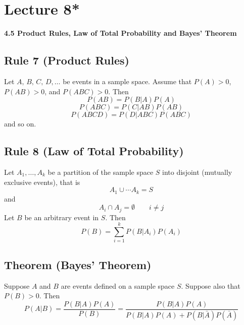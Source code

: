 \section{Lecture 8*}
\textbf{4.5 Product Rules, Law of Total Probability and Bayes' Theorem}

\begin{thmbox}
    \subsection{Rule 7 (Product Rules)}
    Let $ A,\,B,\,C,\,D,\ldots  $ be events in a sample space. Assume
    that $ P(A)>0 $, $ P(AB)>0 $, and $ P(ABC)>0 $. Then
    \[ P(AB)=P(B|A)P(A) \]
    \[ P(ABC)=P(C|AB)P(AB) \]
    \[ P(ABCD)=P(D|ABC)P(ABC) \]
    and so on.
\end{thmbox}

\begin{thmbox}
    \subsection{Rule 8 (Law of Total Probability)}
    Let $ A_1,\ldots ,A_k $ be a partition of the sample space $ S $
    into disjoint (mutually exclusive events), that is
    \[ A_1\cup\cdots A_k=S \]
    and
    \[ A_i\cap A_j=\emptyset\qquad i\neq j \]
    Let $ B $ be an arbitrary event in $ S $. Then
    \[ P(B)=\sum\limits_{i=1}^{k} P(B|A_i)P(A_i) \]
\end{thmbox}

\begin{thmbox}
    \subsection{Theorem (Bayes' Theorem)}
    Suppose $ A $ and $ B $ are events defined on a sample space $ S $. Suppose
    also that $ P(B)>0 $. Then
    \[ P(A|B)=\frac{P(B|A)P(A)}{P(B)}=\frac{P(B|A)P(A)}{P(B|A)P(A)+
    P(B|\bar{A})P(\bar{A})}  \]
    
\end{thmbox}
